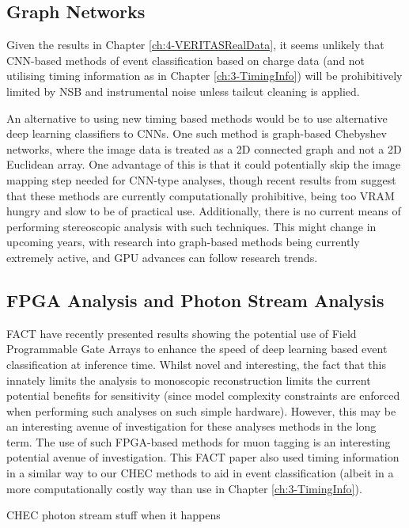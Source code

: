 \subsection{Graph Networks}
Given the results in Chapter \ref{ch:4-VERITASRealData}, it seems unlikely that CNN-based methods of event classification based on charge data (and not utilising timing information as in Chapter \ref{ch:3-TimingInfo}) will be prohibitively limited by NSB and instrumental noise unless tailcut cleaning is applied.

An alternative to using new timing based methods would be to use alternative deep learning classifiers to CNNs. One such method is graph-based Chebyshev networks, where the image data is treated as a 2D connected graph and not a 2D Euclidean array. One advantage of this is that it could potentially skip the image mapping step needed for CNN-type analyses, though recent results from \cite{adithesis} suggest that these methods are currently computationally prohibitive, being too VRAM hungry and slow to be of practical use. Additionally, there is no current means of performing stereoscopic analysis with such techniques. This might change in upcoming years, with research into graph-based methods being currently extremely active, and GPU advances can follow research trends.

\subsection{FPGA Analysis and Photon Stream Analysis}

FACT have recently presented results showing the potential use of Field Programmable Gate Arrays to enhance the speed of deep learning based event classification at inference time. Whilst novel and interesting, the fact that this innately limits the analysis to monoscopic reconstruction limits the current potential benefits for sensitivity (since model complexity constraints are enforced when performing such analyses on such simple hardware). However, this may be an interesting avenue of investigation for these analyses methods in the long term. The use of such FPGA-based methods for muon tagging is an interesting potential avenue of investigation. This FACT paper also used timing information in a similar way to our CHEC methods to aid in event classification (albeit in a more computationally costly way than use in Chapter \ref{ch:3-TimingInfo}).

CHEC photon stream stuff when it happens

